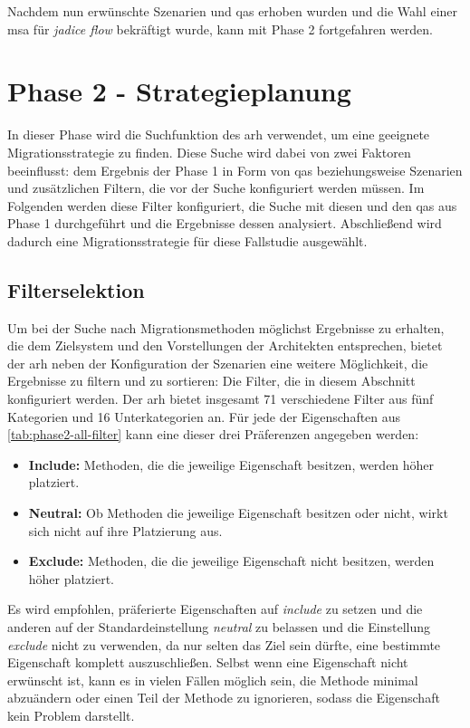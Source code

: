 Nachdem nun erwünschte Szenarien und \glspl{qa} erhoben wurden und die Wahl einer \gls{msa} für \emph{jadice flow} bekräftigt wurde, kann mit Phase 2 fortgefahren werden.

\section{Phase 2 - Strategieplanung}
\label{sec:durchführung-phase2}

In dieser Phase wird die Suchfunktion des \gls{arh} verwendet, um eine geeignete Migrationsstrategie zu finden.
Diese Suche wird dabei von zwei Faktoren beeinflusst: dem Ergebnis der Phase 1 in Form von \glspl{qa} beziehungsweise Szenarien und zusätzlichen Filtern, die vor der Suche konfiguriert werden müssen.
Im Folgenden werden diese Filter konfiguriert, die Suche mit diesen und den \glspl{qa} aus Phase 1 durchgeführt und die Ergebnisse dessen analysiert.
Abschließend wird dadurch eine Migrationsstrategie für diese Fallstudie ausgewählt.

\subsection{Filterselektion}
\label{sec:filterselektion}

Um bei der Suche nach Migrationsmethoden möglichst Ergebnisse zu erhalten, die dem Zielsystem und den Vorstellungen der Architekten entsprechen, bietet der \gls{arh} neben der Konfiguration der Szenarien eine weitere Möglichkeit, die Ergebnisse zu filtern und zu sortieren:
Die Filter, die in diesem Abschnitt konfiguriert werden.
Der \gls{arh} bietet insgesamt 71 verschiedene Filter aus fünf Kategorien und 16 Unterkategorien an.
Für jede der Eigenschaften aus \cref{tab:phase2-all-filter} kann eine dieser drei Präferenzen angegeben werden:
\begin{itemize}
	\item \textbf{Include:} Methoden, die die jeweilige Eigenschaft besitzen, werden höher platziert.
	\item \textbf{Neutral:} Ob Methoden die jeweilige Eigenschaft besitzen oder nicht, wirkt sich nicht auf ihre Platzierung aus.
	\item \textbf{Exclude:} Methoden, die die jeweilige Eigenschaft nicht besitzen, werden höher platziert.
\end{itemize}
Es wird empfohlen, präferierte Eigenschaften auf \emph{include} zu setzen und die anderen auf der Standardeinstellung \emph{neutral} zu belassen und die Einstellung \emph{exclude} nicht zu verwenden, da nur selten das Ziel sein dürfte, eine bestimmte Eigenschaft komplett auszuschließen.
Selbst wenn eine Eigenschaft nicht erwünscht ist, kann es in vielen Fällen möglich sein, die Methode minimal abzuändern oder einen Teil der Methode zu ignorieren, sodass die Eigenschaft kein Problem darstellt.

